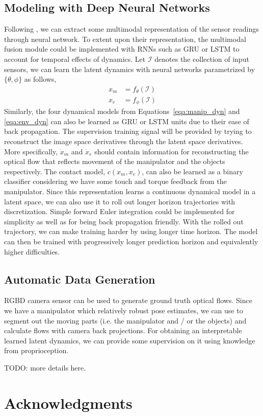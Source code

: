 \documentclass[conference]{IEEEtran}
\begin{document}
\subsection{Modeling with Deep Neural Networks}
Following \citet{vision_touch}, we can extract some multimodal representation
of the sensor readings through neural network. To extent upon their representation,
the multimodal fusion module could be implemented with RNNs such as GRU or LSTM
to account for temporal effects of dynamics. Let $\mathcal{I}$ denotes the
collection of input sensors, we can learn the latent dynamics with neural
networks parametrized by $\{\theta, \phi\}$ as follows,
\begin{align}
  x_m &= f_\theta(\mathcal{I}) \\
  x_e &= f_\phi(\mathcal{I})
\end{align}
Similarly, the four dynamical models from Equations~\ref{eqa:manip_dyn} and
\ref{eqa:env_dyn} can also be learned as GRU or LSTM units
due to their ease of back propagation. The supervision training signal
will be provided by trying to reconstruct the image space derivatives
through the latent space derivatives. More specifically, $\dot{x}_m$ and
$\dot{x}_e$ should contain information for reconstructing the optical flow
that reflects movement of the manipulator and the objects respectively.
The contact model, $c(x_m, x_e)$, can also be learned as a binary classifier
considering we have some touch and torque feedback from the manipulator.
Since this representation learns a continuous dynamical model in a latent
space, we can also use it to roll out longer horizon trajectories with
discretization. Simple forward Euler integration could be implemented for
simplicity as well as for being back propagation friendly. With the rolled
out trajectory, we can make training harder by using longer time horizon.
The model can then be trained with progressively longer prediction horizon
and equivalently higher difficulties.

\subsection{Automatic Data Generation}
RGBD camera sensor can be used to generate ground truth optical flows.
Since we have a manipulator which relatively robust pose estimates, we can
use \cite{3d_detection} to segment out the moving parts (i.e. the manipulator
and / or the objects) and calculate flows with camera back projections.
For obtaining an interpretable learned latent dynamics, we can provide
some supervision on it using knowledge from proprioception.

TODO: more details here.

\section*{Acknowledgments}



\end{document}
